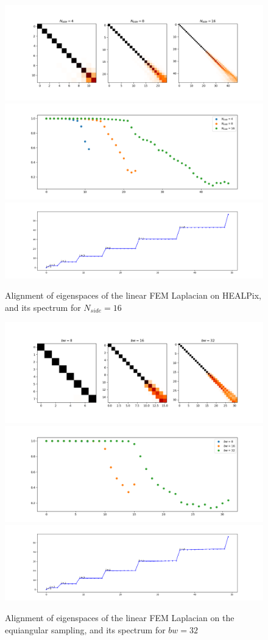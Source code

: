 \begin{figure}[h!]	
	\centering
	\includegraphics[width=0.65\linewidth]{../codes/03.FEM_laplacian/HEALPix/img/linearFEM.png}\\
	\includegraphics[width=0.65\linewidth]{../codes/03.FEM_laplacian/HEALPix/img/linearFEM_diagonal.png}	\\
	\includegraphics[width=0.65\linewidth]{../codes/03.FEM_laplacian/HEALPix/img/FEM_eigenvalues_16.png}	\\
	\caption{	\label{fig:FEMHealpix}Alignment of eigenspaces of the linear FEM Laplacian on HEALPix, and its spectrum for $N_{side}=16$}
\end{figure}
\begin{figure}[h!]
	\centering
	\includegraphics[width=0.65\linewidth]{../codes/03.FEM_laplacian/equiangular/normal/img/linearFEM.png}
	\includegraphics[width=0.65\linewidth]{../codes/03.FEM_laplacian/equiangular/normal/img/linearFEM_diagonal.png}	
	\includegraphics[width=0.65\linewidth]{../codes/03.FEM_laplacian/equiangular/normal/img/FEM_eigenvalues_16.png}	
	\caption{\label{fig:FEMequiangular}Alignment of eigenspaces of the linear FEM Laplacian on the equiangular sampling, and its spectrum for $bw=32$}
\end{figure}

\clearpage






